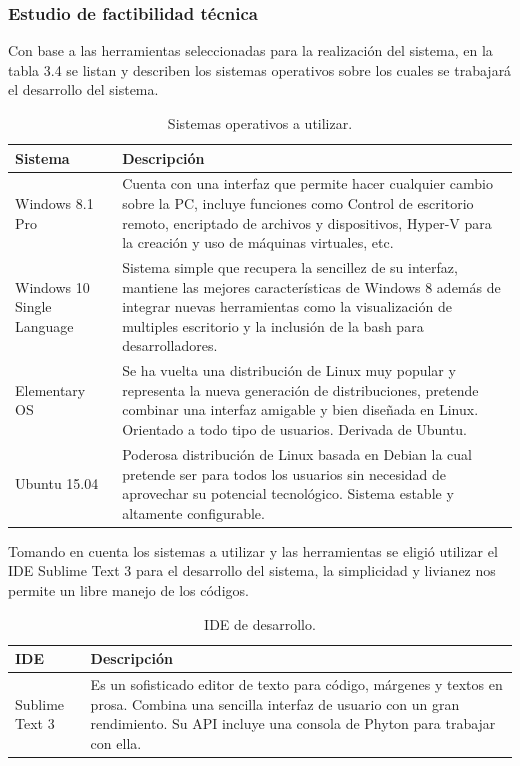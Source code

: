\documentclass[12pt]{report}
\begin{document}
\subsubsection{Estudio de factibilidad técnica}
Con base a las herramientas seleccionadas para la realización del sistema, en la tabla 3.4 se listan y describen los sistemas operativos sobre los cuales se trabajará el desarrollo del sistema.
\begin{table}[H]
\begin{center}
\begin{tabular}{|p{40mm}|p{100mm}|}
\hline
Sistema & Descripción\\
\hline \hline 
Windows 8.1 Pro & Cuenta con una interfaz que permite hacer cualquier cambio sobre la PC, incluye funciones como Control de escritorio remoto, encriptado de archivos y dispositivos, Hyper-V para la creación y uso de máquinas virtuales, etc.\cite{win8}\\
\hline
Windows 10 Single Language & Sistema simple que recupera la sencillez de su interfaz, mantiene las mejores características de Windows 8 además de integrar nuevas herramientas como la visualización de multiples escritorio y la inclusión de la bash para desarrolladores.\cite{win10}\\
\hline
Elementary OS & Se ha vuelta una distribución de Linux muy popular y representa la nueva generación de distribuciones, pretende combinar una interfaz amigable y bien diseñada en Linux. Orientado a todo tipo de usuarios. Derivada de Ubuntu.\cite{elemen}\\
\hline
Ubuntu 15.04 & Poderosa distribución de Linux basada en Debian la cual pretende ser para todos los usuarios sin necesidad de aprovechar su potencial tecnológico. Sistema estable y altamente configurable.\cite{ubun}\\
\hline
\end{tabular}
\caption{Sistemas operativos a utilizar.}
\end{center}
\end{table}

Tomando en cuenta los sistemas a utilizar y las herramientas se eligió utilizar el IDE Sublime Text 3 para el desarrollo del sistema, la simplicidad y livianez nos permite un libre manejo de los códigos.
\begin{table}[H]
\begin{center}
\begin{tabular}{|p{40mm}|p{100mm}|}
\hline
IDE & Descripción\\
\hline \hline 
Sublime Text 3 & Es un sofisticado editor de texto para código, márgenes y textos en prosa. Combina una sencilla interfaz de usuario con un gran rendimiento. Su API incluye una consola de Phyton para trabajar con ella.\cite{subli}\\
\hline
\end{tabular}
\caption{IDE de desarrollo.}
\end{center}
\end{table}
\end{document}

